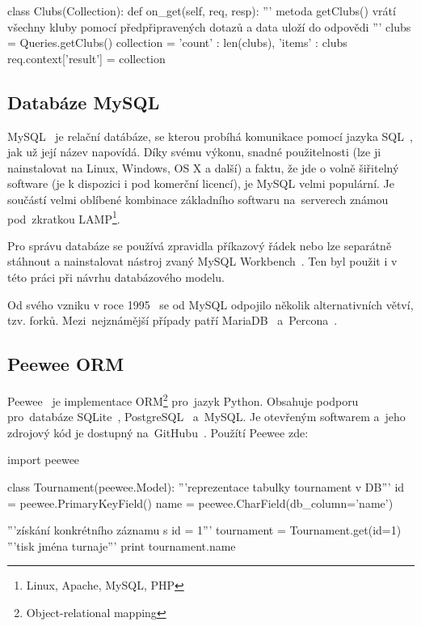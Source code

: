 \begin{python}
class Clubs(Collection):
    def on_get(self, req, resp):
        '''
        metoda getClubs() vrátí všechny kluby
        pomocí předpřipravených dotazů a data
        uloží do odpovědi
        '''
        clubs = Queries.getClubs()
        collection = {
            'count' : len(clubs),
            'items' : clubs
        }
        req.context['result'] = collection
\end{python}

\subsection{Databáze MySQL}


MySQL~\cite{mysql} je relační datábáze, se kterou probíhá komunikace pomocí jazyka SQL~\cite{sql}, jak už její název napovídá.
Díky svému výkonu, snadné použitelnosti (lze ji nainstalovat na Linux, Windows, OS X a další) a faktu,
že jde o volně šiřitelný software (je k dispozici i pod komerční licencí),
je MySQL velmi populární. Je součástí velmi oblíbené kombinace
základního softwaru na~serverech známou pod~zkratkou LAMP\footnote{Linux, Apache, MySQL, PHP}.

Pro správu databáze se používá zpravidla příkazový řádek nebo lze separátně stáhnout
a nainstalovat nástroj zvaný MySQL Workbench~\cite{workbench}. Ten byl použit i v této práci při návrhu databázového modelu.

Od svého vzniku v roce 1995~\cite{mysql_history} se od MySQL odpojilo několik alternativních větví, tzv. forků.
Mezi~nejznámější případy patří MariaDB~\cite{mariadb} a~Percona~\cite{percona}.

\subsection{Peewee ORM}

Peewee~\cite{peewee} je implementace ORM\footnote{Object-relational mapping} pro~jazyk Python.
Obsahuje podporu pro~databáze SQLite~\cite{sqllite}, PostgreSQL~\cite{postgresql} a~MySQL.
Je otevřeným softwarem a~jeho zdrojový kód je dostupný na~GitHubu~\cite{github}. Použítí Peewee zde: 

\begin{python}
import peewee

class Tournament(peewee.Model):
   '''reprezentace tabulky tournament v DB'''
   id = peewee.PrimaryKeyField()
   name = peewee.CharField(db_column='name')

'''získání konkrétního záznamu s id = 1'''
tournament = Tournament.get(id=1)
'''tisk jména turnaje'''
print tournament.name
\end{python}

